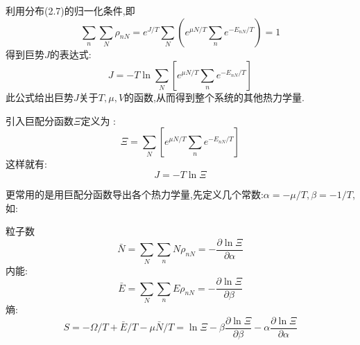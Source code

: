 利用分布(2.7)的归一化条件,即 
\[\sum_n\sum_N \rho_{nN}=e^{J / T}\sum_N\left( e^{\mu N / T} \sum_n e^{-E_{nN} / T} \right) =1 \]
得到巨势$J$的表达式:
\begin{equation}
  J= -T \ln\sum_N\left[ e^{\mu N / T}\sum_ne^{-E_{nN} / T} \right] 
\end{equation}
此公式给出巨势$J$关于$T,\mu , V$的函数,从而得到整个系统的其他热力学量.

引入巨配分函数$\Xi$定义为 :
\begin{equation}
  \Xi=\sum_N\left[ e^{\mu N / T}\sum_ne^{-E_{nN} / T} \right]
\end{equation}
这样就有:
\begin{equation}
  J=-T\ln\Xi
\end{equation}


更常用的是用巨配分函数导出各个热力学量,先定义几个常数:$\alpha=-\mu /T,\beta=-1/T$,如:

粒子数\[\bar{N}=\sum_N \sum _nN\rho_{nN}=-\dfrac{\partial \ln \Xi}{\partial \alpha}\]
内能:\[\bar{E}=\sum_N \sum_n E \rho_{nN}=-\dfrac{\partial \ln \Xi}{\partial \beta}\]
熵:\[S = -\Omega/T+\bar{E}/T -\mu \bar{N} /T=\ln \Xi-\beta\dfrac{\partial \ln\Xi}{\partial \beta}-\alpha\dfrac{\partial \ln\Xi}{\partial \alpha}\]

